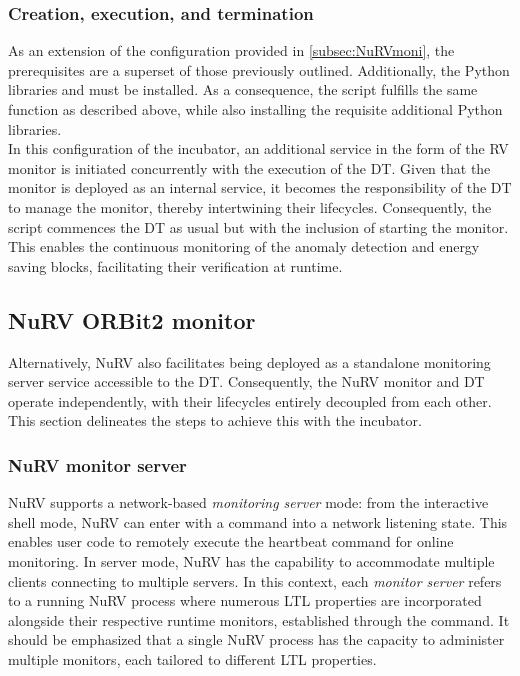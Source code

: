 \subsubsection{Creation, execution, and termination}
As an extension of the configuration provided in \cref{subsec:NuRVmoni}, the prerequisites are a superset of those previously outlined.
Additionally, the Python libraries  and  must be installed.
As a consequence, the  script fulfills the same function as described above, while also installing the requisite additional Python libraries.\\
In this configuration of the incubator, an additional service in the form of the RV monitor is initiated concurrently with the execution of the DT.
Given that the monitor is deployed as an internal service, it becomes the responsibility of the DT to manage the monitor, thereby intertwining their lifecycles.
Consequently, the  script commences the DT as usual but with the inclusion of starting the monitor.
This enables the continuous monitoring of the anomaly detection and energy saving blocks, facilitating their verification at runtime.

\subsection{NuRV ORBit2 monitor}\label{subsec:NuRVORBIT}
Alternatively, NuRV also facilitates being deployed as a standalone monitoring server service accessible to the DT.
Consequently, the NuRV monitor and DT operate independently, with their lifecycles entirely decoupled from each other.
This section delineates the steps to achieve this with the incubator.

\subsubsection{NuRV monitor server}
NuRV supports a network-based \textit{monitoring server} mode: from the interactive shell mode, NuRV can enter with a command into a network listening state. This enables user code to remotely execute the heartbeat command for online monitoring.
In server mode, NuRV has the capability to accommodate multiple clients connecting to multiple servers. In this context, each \textit{monitor server} refers to a running NuRV process where numerous LTL properties are incorporated alongside their respective runtime monitors, established through the  command. It should be emphasized that a single NuRV process has the capacity to administer multiple monitors, each tailored to different LTL properties.


